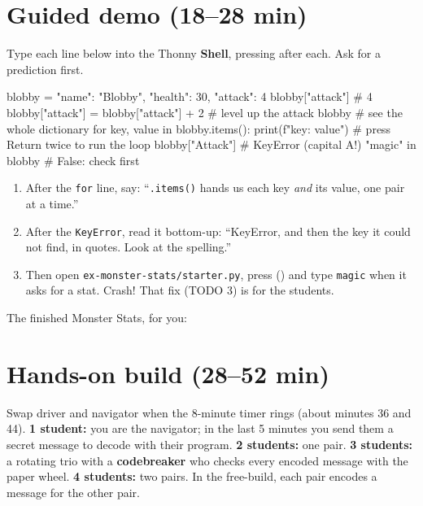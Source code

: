 \section{Guided demo (18--28 min)}
Type each line below into the Thonny \textbf{Shell}, pressing  after each. Ask for a prediction first.
\begin{pycode}
blobby = {"name": "Blobby", "health": 30, "attack": 4}
blobby["attack"]                          # 4
blobby["attack"] = blobby["attack"] + 2   # level up the attack
blobby                                    # see the whole dictionary
for key, value in blobby.items():
    print(f"{key}: {value}")              # press Return twice to run the loop
blobby["Attack"]                          # KeyError (capital A!)
"magic" in blobby                         # False: check first
\end{pycode}
\begin{workedexample}
\begin{enumerate}[leftmargin=1.4em]
  \item After the \texttt{for} line, say: \enquote{\texttt{.items()} hands us each key \emph{and} its value, one pair at a time.}
  \item After the \texttt{KeyError}, read it bottom-up: \enquote{KeyError, and then the key it could not find, in quotes. Look at the spelling.}
  \item Then open \texttt{ex-monster-stats/starter.py}, press  () and type \texttt{magic} when it asks for a stat. Crash!
        That fix (TODO 3) is for the students.
\end{enumerate}
\end{workedexample}
The finished Monster Stats, for you:

\section{Hands-on build (28--52 min)}
\begin{pairroles}[Codemakers]
Swap driver and navigator when the 8-minute timer rings (about minutes 36 and 44).
\textbf{1 student:} you are the navigator; in the last 5 minutes you send them a secret message to decode with their program.
\textbf{2 students:} one pair. \textbf{3 students:} a rotating trio with a \textbf{codebreaker} who checks every encoded message with the paper wheel.
\textbf{4 students:} two pairs. In the free-build, each pair encodes a message for the other pair.
\end{pairroles}

